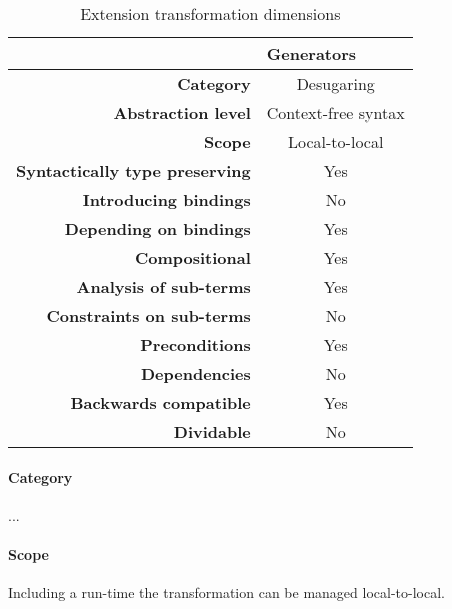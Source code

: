 \begin{table}[h]
\centering
\caption{Extension transformation dimensions}
\label{generators-table}
\begin{tabular}{@{}rc@{}}
\toprule
                                       & \multicolumn{1}{l}{\textbf{Generators}} \\ \midrule
\textbf{Category}                      & Desugaring
\\
\textbf{Abstraction level}          & Context-free syntax                          \\
\textbf{Scope}                         & Local-to-local                               \\
\textbf{Syntactically type preserving} & Yes                                          \\
\textbf{Introducing bindings}          & No                                          \\%
\textbf{Depending on bindings}         & Yes                                           \\
\textbf{Compositional}                 & Yes                                          \\
\textbf{Analysis of sub-terms}          & Yes                                          \\
\textbf{Constraints on sub-terms}       & No                                           \\
\textbf{Preconditions}                 & Yes                                          \\
\textbf{Dependencies}                  & No                                           \\
\textbf{Backwards compatible}          & Yes                                          \\
\textbf{Dividable}                     & No                                           \\ \bottomrule
\end{tabular}
\end{table}

\paragraph{Category}
...

\paragraph{Scope}
Including a run-time the transformation can be managed local-to-local.

